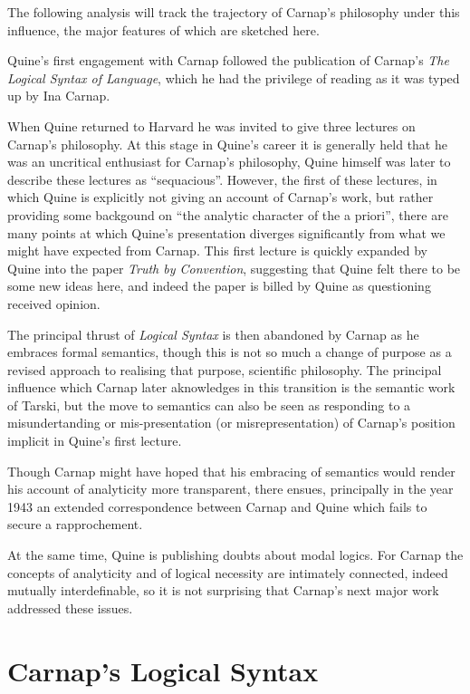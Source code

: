 The following analysis will track the trajectory of Carnap's
philosophy under this influence, the major features of which
are sketched here.

Quine's first engagement with Carnap followed the publication
of Carnap's {\it The Logical Syntax of Language}\cite{Carnap37},
which he had the privilege of reading as it was typed up by
Ina Carnap.

When Quine returned to Harvard he was invited to give three
lectures on Carnap's philosophy.  
At this stage in Quine's career it is generally held that
he was an uncritical enthusiast for Carnap's philosophy,
Quine himself was later to describe these lectures as ``sequacious''.
However, the first of these lectures, in which Quine is explicitly
not giving an account of Carnap's work, but rather providing some
backgound on ``the analytic character of the a priori'', there
are many points at which Quine's presentation diverges significantly
from what we might have expected from Carnap.
This first lecture is quickly expanded by Quine into the paper
{\it Truth by Convention}\cite{Quine36}, suggesting that Quine
felt there to be some new ideas here, and indeed the paper is
billed by Quine as questioning received opinion.

The principal thrust of {\it Logical Syntax} is then abandoned by
Carnap as he embraces formal semantics, though this is not so
much a change of purpose as a revised approach to realising
that purpose, scientific philosophy.
The principal influence which Carnap later aknowledges in this
transition is the semantic work of Tarski, but
the move to semantics can also be seen as responding to a
misundertanding or mis-presentation (or misrepresentation)
of Carnap's position implicit in Quine's first lecture.

Though Carnap might have hoped that his embracing of semantics
would render his account of analyticity more transparent, there
ensues, principally in the year 1943 an extended correspondence
between Carnap and Quine which fails to secure a rapprochement.

At the same time, Quine is publishing doubts about modal logics.
For Carnap the concepts of analyticity and of logical necessity
are intimately connected, indeed mutually interdefinable, so
it is not surprising that Carnap's next major work addressed these
issues.


\section{Carnap's Logical Syntax}

